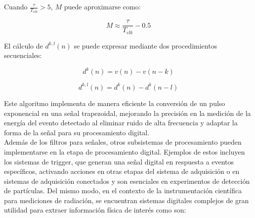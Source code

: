 \documentclass{report}
\begin{document}
\noindent Cuando \( \frac{\tau}{T_{clk}} > 5 \), \( M \) puede aproximarse como:

$$
M \approx \frac{\tau}{T_{clk}} - 0.5
$$

\noindent El cálculo de \( d^{k,l}(n) \) se puede expresar mediante dos procedimientos secuenciales:

\begin{equation}
d^{k}(n) = v(n) - v(n-k)
\end{equation}

\begin{equation}
d^{k,l}(n) = d^{k}(n) - d^{k}(n-l)
\end{equation}

\noindent Este algoritmo implementa de manera eficiente la conversión de un pulso exponencial en una señal trapezoidal, mejorando la precisión en la medición de la energía del evento detectado al eliminar ruido de alta frecuencia y adaptar la forma de la señal para su procesamiento digital.\\

\noindent Además de los filtros para señales, otros subsistemas de procesamiento pueden implementarse en la etapa de procesamiento digital. Ejemplos de estos incluyen los sistemas de trigger, que generan una señal digital en respuesta a eventos específicos, activando acciones en otras etapas del sistema de adquisición o en sistemas de adquisición conectados y son esenciales en experimentos de detección de partículas. Del mismo modo, en el contexto de la instrumentación científica para mediciones de radiación, se encuentran sistemas digitales complejos de gran utilidad para extraer información física de interés como son:
\end{document}
